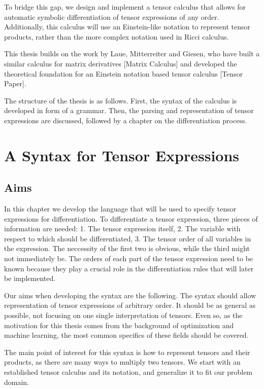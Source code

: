 \documentclass[12pt, a4paper]{report}
\begin{document}
To bridge this gap, we design and implement a tensor calculus that allows for automatic symbolic differentiation of tensor expressions of any order.
Additionally, this calculus will use an Einstein-like notation to represent tensor products, rather than the more complex notation used in Ricci calculus.

This thesis builds on the work by Laue, Mitterreiter and Giesen, who have built a similar calculus for matrix derivatives [Matrix Calculus] and developed the theoretical foundation for an Einstein notation based tensor calculus [Tensor Paper].

The structure of the thesis is as follows.
First, the syntax of the calculus is developed in form of a grammar.
Then, the parsing and representation of tensor expressions are discussed, followed by a chapter on the differentiation process.

\chapter{A Syntax for Tensor Expressions}
\section{Aims}
In this chapter we develop the language that will be used to specify tensor expressions for differentiation.
To differentiate a tensor expression, three pieces of information are needed: 1. The tensor expression itself, 2. The variable with respect to which should be differentiated, 3. The tensor order of all variables in the expression.
The neccessity of the first two is obvious, while the third might not immediately be.
The orders of each part of the tensor expression need to be known because they play a crucial role in the differentiation rules that will later be implemented.

Our aims when developing the syntax are the following.
The syntax should allow representation of tensor expressions of arbitrary order.
It should be as general as possible, not focusing on one single interpretation of tensors.
Even so, as the motivation for this thesis comes from the background of optimization and machine learning, the most common specifics of these fields should be covered.

The main point of interest for this syntax is how to represent tensors and their products, as there are many ways to multiply two tensors.
We start with an established tensor calculus and its notation, and generalize it to fit our problem domain.
\end{document}
